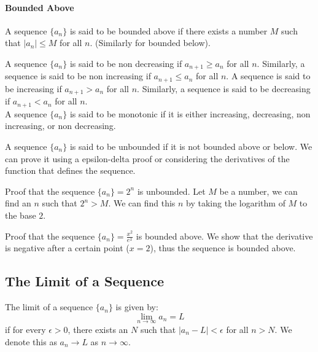 \documentclass[11pt]{report}
\begin{document}
\paragraph{Bounded Above} A sequence $\{a_n\}$ is said to be bounded above if there exists a number $M$ such that $|a_n| \le M$ for all $n$. (Similarly for bounded below).
\begin{definition}
    A sequence $\{a_n\}$ is said to be non decreasing if $a_{n+1} \ge a_n$ for all $n$. Similarly, a sequence is said to be non increasing if $a_{n+1} \le a_n$ for all $n$. A sequence is said to be increasing if $a_{n+1} > a_n$ for all $n$. Similarly, a sequence is said to be decreasing if $a_{n+1} < a_n$ for all $n$.
\\ A sequence $\{a_n\}$ is said to be monotonic if it is either increasing, decreasing, non increasing, or non decreasing.
\end{definition}
\begin{definition}
    A sequence $\{a_n\}$ is said to be unbounded if it is not bounded above or below. We can prove it using a epsilon-delta proof or considering the derivatives of the function that defines the sequence.
\end{definition}
\begin{example}
    Proof that the sequence $\{a_n\} = 2^n$ is unbounded. Let $M$ be a number, we can find an $n$ such that $2^n > M$. We can find this $n$ by taking the logarithm of $M$ to the base $2$.
\end{example}
\begin{example}
    Proof that the sequence $\{a_n\} = \frac{x^2}{e^x}$ is bounded above. We show that the derivative is negative after a certain point ($x = 2$), thus the sequence is bounded above.
\end{example}
\subsection{The Limit of a Sequence}
\begin{definition}
    The limit of a sequence $\{a_n\}$ is given by:
    \begin{equation*}
        \lim_{n \to \infty} a_n = L
    \end{equation*}
    if for every $\epsilon > 0$, there exists an $N$ such that $|a_n - L| < \epsilon$ for all $n > N$. We denote this as $a_n \to L$ as $n \to \infty$.
\end{definition}
\end{document}
